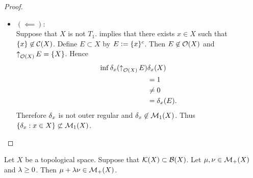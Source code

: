 \documentclass{book}
\begin{document}
\begin{proof}
\begin{itemize}
\begin{enumerate}
\begin{itemize}
					\begin{align*}
						\del_x(U)
						& = 1 \\
						& = \del_x(K) \\
						& \leq \sup \del_x(\doar_{\MK(X)} U) \\
						& \leq \del_x(U).
					\end{align*}
					Hence $\del_x(U) = \sup \del_x(\doar_{\MK(X)} U)$.
					\item Suppose that $x \not \in U$. Then for each $K \in \doar_{\MK(X)} U$, $x \not \in K$ and $\del_x(K) = 0$. Hence
					\begin{align*}
						\del_x(U) 
						& = 0 \\
						& = \sup \del_x(\doar_{\MK(X)} U).
					\end{align*}
				\end{itemize}
				Therefore $\del_x$ is inner regular on $U$. Since $U \in \MO(X)$ is arbitrary, we have that for each $U \in \MO(X)$, $\del_x$ is inner regular on $U$. 
			\end{enumerate}
			Thus $\del_x \in \MM_1(X)$. Since $x \in X$ is arbitrary, we have that for each $x \in X$, $\del_x \in \MM_1(X)$. Hence $\{\del_x:x \in X \} \subset \MM_1(X)$.
			\item $(\impliedby)$: \\
			Suppose that $X$ is not $T_1$.  implies that there exists $x \in X$ such that $\{x\} \not \in \mathcal{C}(X)$. Define $E \subset X$ by $E \vcentcolon= \{x\}^c$. Then $E \not \in \mathcal{O}(X)$ and $\operatorname{\uparrow}_{\mathcal{O}(X)} E = \{X\}$. Hence
			\begin{align*}
				\inf \delta_x(\operatorname{\uparrow}_{\mathcal{O}(X)} E)
				& \delta_x(X) \\
				& = 1 \\
				& \neq 0 \\
				& = \delta_x(E).
			\end{align*}
			Therefore $\del_x$ is not outer regular and $\delta_x \not \in \mathcal{M}_1(X)$. Thus $\{\delta_x:x \in X\} \not \subset \mathcal{M}_1(X)$.
		\end{itemize}
	\end{proof}

	\begin{ex}  
		Let $X$ be a topological space. Suppose that $\mathcal{K}(X) \subset \mathcal{B}(X)$. Let $\mu, \nu \in \mathcal{M}_+(X)$ and $\lambda \geq 0$. Then $\mu + \lambda \nu \in \mathcal{M}_+(X)$. 
	\end{ex}
\end{document}
